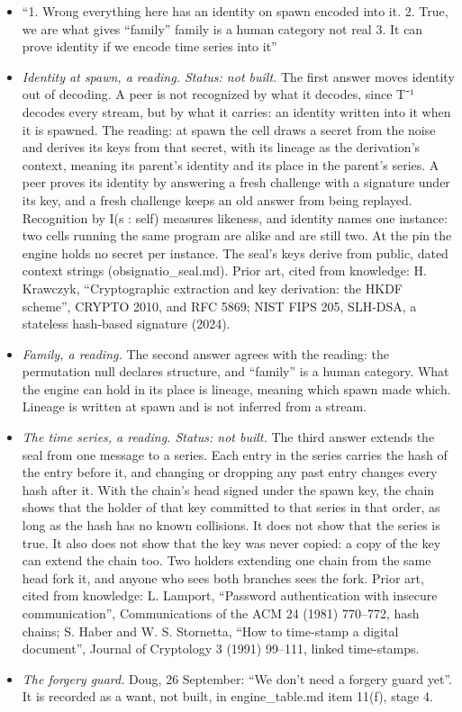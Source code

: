 \begin{itemize}
\item “1. Wrong everything here has an identity on spawn encoded into it. 2. True, we are what gives “family” family is a human category not real 3. It can prove identity if we encode time series into it”
\item \emph{Identity at spawn, a reading. Status: not built.} The first answer moves identity out of decoding. A peer is not recognized by what it decodes, since T⁻¹ decodes every stream, but by what it carries: an identity written into it when it is spawned. The reading: at spawn the cell draws a secret from the noise and derives its keys from that secret, with its lineage as the derivation's context, meaning its parent's identity and its place in the parent's series. A peer proves its identity by answering a fresh challenge with a signature under its key, and a fresh challenge keeps an old answer from being replayed. Recognition by I(s : self) measures likeness, and identity names one instance: two cells running the same program are alike and are still two. At the pin the engine holds no secret per instance. The seal's keys derive from public, dated context strings (obsignatio\_\allowbreak{}seal.md). Prior art, cited from knowledge: H. Krawczyk, “Cryptographic extraction and key derivation: the HKDF scheme”, CRYPTO 2010, and RFC 5869; NIST FIPS 205, SLH-DSA, a stateless hash-based signature (2024).
\item \emph{Family, a reading.} The second answer agrees with the reading: the permutation null declares structure, and “family” is a human category. What the engine can hold in its place is lineage, meaning which spawn made which. Lineage is written at spawn and is not inferred from a stream.
\item \emph{The time series, a reading. Status: not built.} The third answer extends the seal from one message to a series. Each entry in the series carries the hash of the entry before it, and changing or dropping any past entry changes every hash after it. With the chain's head signed under the spawn key, the chain shows that the holder of that key committed to that series in that order, as long as the hash has no known collisions. It does not show that the series is true. It also does not show that the key was never copied: a copy of the key can extend the chain too. Two holders extending one chain from the same head fork it, and anyone who sees both branches sees the fork. Prior art, cited from knowledge: L. Lamport, “Password authentication with insecure communication”, Communications of the ACM 24 (1981) 770–772, hash chains; S. Haber and W. S. Stornetta, “How to time-stamp a digital document”, Journal of Cryptology 3 (1991) 99–111, linked time-stamps.
\item \emph{The forgery guard.} Doug, 26 September: “We don't need a forgery guard yet”. It is recorded as a want, not built, in engine\_\allowbreak{}table.md item 11(f), stage 4.
\end{itemize}
